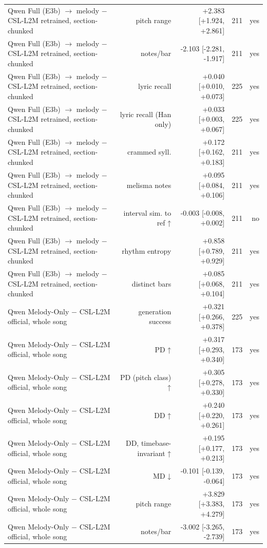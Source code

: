 \begin{table}[t]
\begin{tabular}{lrrrr}
Qwen Full (E3b) $\rightarrow$ melody $-$ CSL-L2M retrained, section-chunked & pitch range & +2.383 [+1.924, +2.861] & 211 & yes \\
Qwen Full (E3b) $\rightarrow$ melody $-$ CSL-L2M retrained, section-chunked & notes/bar & -2.103 [-2.281, -1.917] & 211 & yes \\
Qwen Full (E3b) $\rightarrow$ melody $-$ CSL-L2M retrained, section-chunked & lyric recall & +0.040 [+0.010, +0.073] & 225 & yes \\
Qwen Full (E3b) $\rightarrow$ melody $-$ CSL-L2M retrained, section-chunked & lyric recall (Han only) & +0.033 [+0.003, +0.067] & 225 & yes \\
Qwen Full (E3b) $\rightarrow$ melody $-$ CSL-L2M retrained, section-chunked & crammed syll. & +0.172 [+0.162, +0.183] & 211 & yes \\
Qwen Full (E3b) $\rightarrow$ melody $-$ CSL-L2M retrained, section-chunked & melisma notes & +0.095 [+0.084, +0.106] & 211 & yes \\
Qwen Full (E3b) $\rightarrow$ melody $-$ CSL-L2M retrained, section-chunked & interval sim. to ref ↑ & -0.003 [-0.008, +0.002] & 211 & no \\
Qwen Full (E3b) $\rightarrow$ melody $-$ CSL-L2M retrained, section-chunked & rhythm entropy & +0.858 [+0.789, +0.929] & 211 & yes \\
Qwen Full (E3b) $\rightarrow$ melody $-$ CSL-L2M retrained, section-chunked & distinct bars & +0.085 [+0.068, +0.104] & 211 & yes \\
Qwen Melody-Only $-$ CSL-L2M official, whole song & generation success & +0.321 [+0.266, +0.378] & 225 & yes \\
Qwen Melody-Only $-$ CSL-L2M official, whole song & PD ↑ & +0.317 [+0.293, +0.340] & 173 & yes \\
Qwen Melody-Only $-$ CSL-L2M official, whole song & PD (pitch class) ↑ & +0.305 [+0.278, +0.330] & 173 & yes \\
Qwen Melody-Only $-$ CSL-L2M official, whole song & DD ↑ & +0.240 [+0.220, +0.261] & 173 & yes \\
Qwen Melody-Only $-$ CSL-L2M official, whole song & DD, timebase-invariant ↑ & +0.195 [+0.177, +0.213] & 173 & yes \\
Qwen Melody-Only $-$ CSL-L2M official, whole song & MD ↓ & -0.101 [-0.139, -0.064] & 173 & yes \\
Qwen Melody-Only $-$ CSL-L2M official, whole song & pitch range & +3.829 [+3.383, +4.279] & 173 & yes \\
Qwen Melody-Only $-$ CSL-L2M official, whole song & notes/bar & -3.002 [-3.265, -2.739] & 173 & yes \\

\end{tabular}
\end{table}
